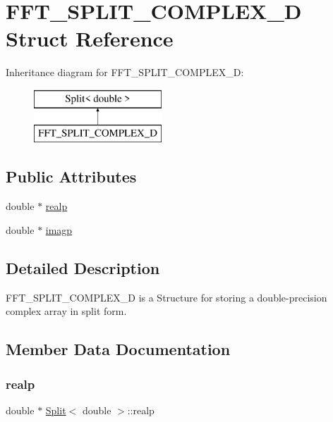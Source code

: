 \hypertarget{struct_double_split}{}\section{F\+F\+T\+\_\+\+S\+P\+L\+I\+T\+\_\+\+C\+O\+M\+P\+L\+E\+X\+\_\+D Struct Reference}
\label{struct_double_split}
Inheritance diagram for F\+F\+T\+\_\+\+S\+P\+L\+I\+T\+\_\+\+C\+O\+M\+P\+L\+E\+X\+\_\+D\+:\begin{figure}[H]
\begin{center}
\leavevmode
\includegraphics[height=2.000000cm]{struct_double_split}
\end{center}
\end{figure}
\subsection*{Public Attributes}
\begin{DoxyCompactItemize}
\item 
double $\ast$ \hyperlink{_h_i_s_s_tools___f_f_t_8h_aaadcedfa082d6f07b33cd89ea4f19814}{realp}
\item 
double $\ast$ \hyperlink{_h_i_s_s_tools___f_f_t_8h_a21ff23a96abee0c0ed6a2433798c4eac}{imagp}
\end{DoxyCompactItemize}


\subsection{Detailed Description}
F\+F\+T\+\_\+\+S\+P\+L\+I\+T\+\_\+\+C\+O\+M\+P\+L\+E\+X\+\_\+D is a Structure for storing a double-\/precision complex array in split form. 

\subsection{Member Data Documentation}
\mbox{\label{_h_i_s_s_tools___f_f_t_8h_aaadcedfa082d6f07b33cd89ea4f19814}} 
\subsubsection{\texorpdfstring{realp}{realp}}
{\footnotesize\ttfamily double $\ast$ \hyperlink{_h_i_s_s_tools___f_f_t_8h_struct_split}{Split}$<$ double  $>$\+::realp\hspace{0.3cm}{\ttfamily [inherited]}}

